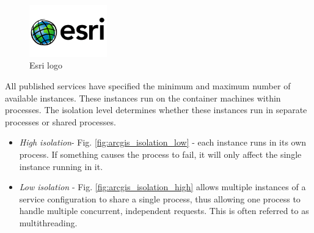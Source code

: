 \documentclass[12pt,a4paper]{article}
\begin{document}
\begin{figure}[h!]
\centering
\includegraphics[width=0.3\textwidth]{img/Intro_esri.png}
\caption{Esri logo}
\label{fig:geoserver_status}
\end{figure}

All published services have specified the minimum and maximum number of available instances. These instances run on the container machines within processes. The isolation level determines whether these instances run in separate processes or shared processes. 
\begin{itemize}
\item \textit{High isolation}- Fig. \ref{fig:arcgis_isolation_low} - each instance runs in its own process. If something causes the process to fail, it will only affect the single instance running in it.
\item \textit{Low isolation} - Fig. \ref{fig:arcgis_isolation_high} allows multiple instances of a service configuration to share a single process, thus allowing one process to handle multiple concurrent, independent requests. This is often referred to as multithreading.
\end{itemize} 

\begin{figure}[h!]
\centering
\begin{floatrow}
\end{floatrow}
\end{figure}
\end{document}

